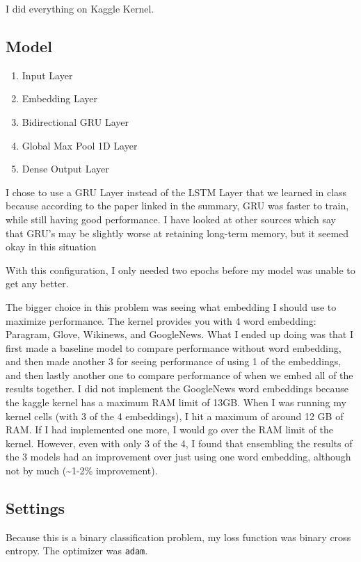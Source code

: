 \documentclass[11pt]{article}
\begin{document}
I did everything on Kaggle Kernel.

\subsection{Model}
\label{sec:org94d7c38}

\begin{enumerate}
\item Input Layer
\item Embedding Layer
\item Bidirectional GRU Layer
\item Global Max Pool 1D Layer
\item Dense Output Layer
\end{enumerate}

I chose to use a GRU Layer instead of the LSTM Layer that we learned in class because according to the paper 
linked in the summary, GRU was faster to train, while still having good performance. I have looked at other 
sources which say that GRU's may be slightly worse at retaining long-term memory, but it seemed okay in this situation

With this configuration, I only needed two epochs before my model was unable to get any better.


The bigger choice in this problem was seeing what embedding I should use to maximize performance.
The kernel provides you with 4 word embedding: Paragram, Glove, Wikinews, and GoogleNews. What I ended up doing was that I first made a baseline
model to compare performance without word embedding, and then made another 3 for seeing performance of using 1 of the embeddings,
and then lastly another one to compare performance of when we embed all of the results together. I did not implement the GoogleNews word 
embeddings because the kaggle kernel has a maximum RAM limit of 13GB. When I was running my kernel cells (with 3 of the 4 embeddings), 
I hit a maximum of around 12 GB of RAM. If I had implemented one more, I would go over the RAM limit of the kernel. However, even with only 3 of the 4,
I found that ensembling the results of the 3 models had an improvement over just using one word embedding, although not by much (\textasciitilde{}1-2\% improvement).


\subsection{Settings}
\label{sec:org579cb4f}

Because this is a binary classification problem, my loss function was binary cross entropy. The optimizer was \texttt{adam}.
\end{document}
